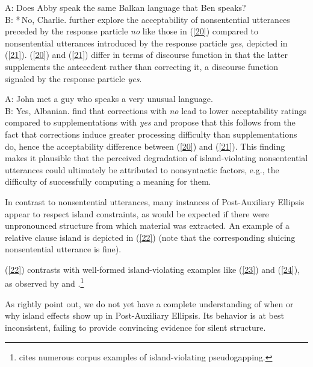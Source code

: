 \ea 
A: Does Abby speak the same Balkan language that Ben speaks?\\
B: *\,No, Charlie. \citep[688]{Merchant2005a}  \label{20}
\z
%
\citet{Schmeh2015} further explore the acceptability of nonsentential utterances preceded by the response particle \textit{no} like those in (\ref{20}) compared to nonsentential utterances introduced by the response particle \textit{yes}, depicted in (\ref{21}). (\ref{20}) and (\ref{21}) differ in terms of discourse function in that the latter supplements the antecedent rather than correcting it, a discourse function signaled by the response particle \textit{yes}.

\ea A: John met a guy who speaks a very unusual language. \\B: Yes, Albanian. \citep[245]{CJ2005a} \label{21}\z
%
\citet{Schmeh2015} find that corrections with \textit{no} lead to
lower acceptability ratings compared to 
supplementations with \textit{yes} and propose that this follows from the fact that corrections induce greater processing difficulty than supplementations do, hence the acceptability difference between (\ref{20}) and (\ref{21}). This finding makes it plausible that the perceived degradation of island-violating nonsentential utterances could ultimately be attributed to nonsyntactic factors, e.g., the difficulty of successfully computing a meaning for them.

In contrast to nonsentential utterances, many instances of Post-Auxiliary Ellipsis appear to respect island constraints, as would be expected if there were unpronounced structure from which material was extracted. An example of a relative clause island is depicted in (\ref{22}) (note that the corresponding sluicing nonsentential utterance  is fine).


\z
(\ref{22}) contrasts with well-formed island-violating examples like (\ref{23}) and (\ref{24}), as observed by \citet[]{Miller2014} and \citet[]{Ginzburg2018}.\footnote{\citet{Miller2014} cites numerous corpus examples of island-violating pseudogapping.}
%
%
\ealnoraggedright
{}

\zl
%
As \citet{Ginzburg2018} rightly point out, we do not yet have a complete understanding of when or why island effects show up in Post-Auxiliary Ellipsis. Its behavior is at best inconsistent, failing to provide convincing evidence for silent structure.


